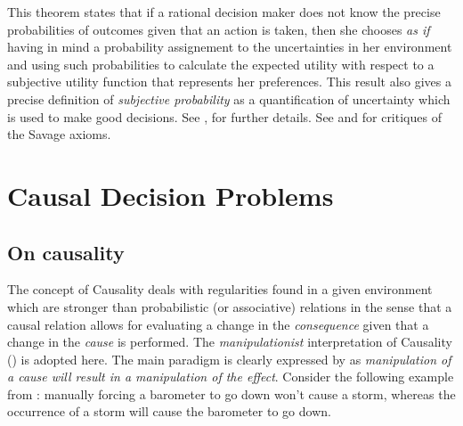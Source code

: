 \documentclass{article}
\theoremstyle{plain}
\begin{document}
This theorem states that if a rational decision maker does not know the precise probabilities of outcomes given that an action is taken, then she chooses \textit{as if} having in mind a probability assignement to the uncertainties in her environment and using such probabilities to calculate the expected utility with respect to a subjective utility function that represents her preferences. This result also gives a precise definition of \textit{subjective probability} as a quantification of uncertainty which is used to make good decisions. See \cite{hens1992note}, \cite{gilboa2009decision} for further details. See \cite{ellsberg1961risk} and \cite{binmore2008rational} for critiques of the Savage axioms. 
\section{Causal Decision Problems}
\subsection{On causality}
The concept of Causality deals with regularities found in a given environment which are stronger than probabilistic (or associative) relations in the sense that a causal relation allows for evaluating a change in the \textit{consequence} given that a change in the \textit{cause} is performed. The \textit{manipulationist} interpretation of Causality (\cite{woodward2005making}) is adopted here. The main paradigm is clearly expressed by \cite{campbell1979quasi} as \textit{manipulation of a cause will result in a manipulation of the effect}. Consider the following example from \cite{woodward2005making}: manually forcing a barometer to go down won't cause a storm, whereas the occurrence of a storm will cause the barometer to go down. 
\end{document}
